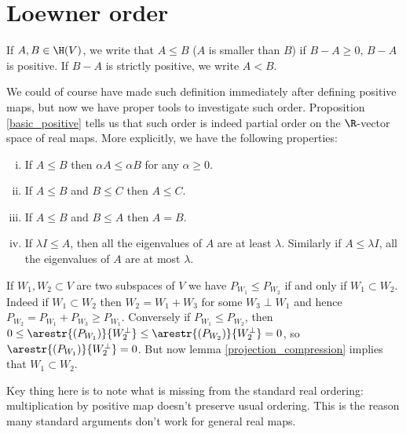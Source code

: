 \section{Loewner order}

\begin{maar}
	If $A, B \in \H(V)$, we write that $A \leq B$ ($A$ is smaller than $B$) if $B - A \geq 0$, $B - A$ is positive. If $B - A$ is strictly positive, we write $A < B$.
\end{maar}

We could of course have made such definition immediately after defining positive maps, but now we have proper tools to investigate such order. Proposition \ref{basic_positive} tells us that such order is indeed partial order on the $\R$-vector space of real maps. More explicitly, we have the following properties:


\begin{prop}
\begin{enumerate}[(i)]
		\item If $A \leq B$ then $\alpha A \leq \alpha B$ for any $\alpha \geq 0$.
		\item If $A \leq B$ and $B \leq C$ then $A \leq C$.
		\item If $A \leq B$ and $B \leq A$ then $A = B$.
		\item If $\lambda I \leq A$, then all the eigenvalues of $A$ are at least $\lambda$. Similarly if $A \leq \lambda I$, all the eigenvalues of $A$ are at most $\lambda$.
\end{enumerate}
\end{prop}

\begin{esim}\label{projection_order}
	If $W_{1}, W_{2} \subset V$ are two subspaces of $V$ we have $P_{W_{1}} \leq P_{W_{2}}$ if and only if $W_{1} \subset W_{2}$. Indeed if $W_{1} \subset W_{2}$ then $W_{2} = W_{1} + W_{3}$ for some $W_{3} \perp W_{1}$ and hence $P_{W_{2}} = P_{W_{1}} + P_{W_{3}} \geq P_{W_{1}}$. Conversely if $P_{W_{1}} \leq P_{W_{2}}$, then $0 \leq \arestr{(P_{W_{1}})}{W_{2}^{\perp}} \leq \arestr{(P_{W_{2}})}{W_{2}^{\perp}} = 0$, so $\arestr{(P_{W_{1}})}{W_{2}^{\perp}} = 0$. But now lemma \ref{projection_compression} implies that $W_{1} \subset W_{2}$.
\end{esim}

Key thing here is to note what is missing from the standard real ordering: multiplication by positive map doesn't preserve usual ordering. This is the reason many standard arguments don't work for general real maps.

